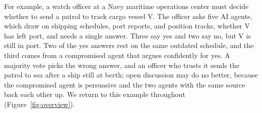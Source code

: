 \documentclass[12pt,letterpaper]{article}
\begin{document}
For example, a watch officer at a Navy maritime operations center must decide whether to send a patrol to track cargo vessel V. The officer asks five AI agents, which draw on shipping schedules, port reports, and position tracks, whether V has left port, and needs a single answer. Three say yes and two say no, but V is still in port. Two of the yes answers rest on the same outdated schedule, and the third comes from a compromised agent that argues confidently for yes. A majority vote picks the wrong answer, and an officer who trusts it sends the patrol to sea after a ship still at berth; open discussion may do no better, because the compromised agent is persuasive and the two agents with the same source back each other up. We return to this example throughout (Figure~\ref{fig:overview}).
\end{document}
